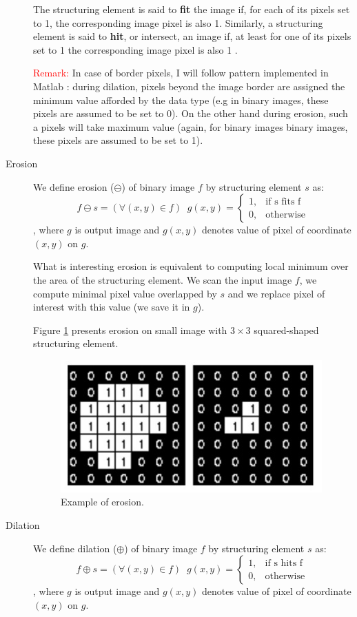 \documentclass{article}
\begin{document}
\begin{description}
The structuring element is said to \textbf{fit} the image if, for each of its pixels set to 1, the corresponding image pixel is also 1. Similarly, a structuring element is said to \textbf{hit}, or intersect, an image if, at least for one of its pixels set to 1 the corresponding image pixel is also 1 \cite{morphological}.

\textcolor{red}{Remark:} In case of border pixels, I will follow pattern implemented in Matlab \cite{matlab}: during dilation, pixels beyond the image border are assigned the minimum value afforded by the data type (e.g in binary images, these pixels are assumed to be set to 0). On the other hand during erosion, such a pixels will take maximum value (again, for binary images binary images, these pixels are assumed to be set to 1).

%
%
\item[Erosion] We define erosion ($\ominus$) of binary image $f$ by structuring element $s$ as:
\[
    f \ominus s= (\forall{(x,y) \in f})  \;\;
    g(x,y) = 
\begin{cases}
    1,& \text{if s fits f }\\
    0,              & \text{otherwise}
\end{cases} 
\]
, where $g$ is output image and $g(x,y)$ denotes value of pixel of coordinate $(x,y)$ on $g$.

What is interesting erosion is equivalent to computing local minimum over the area of the structuring element. We scan the input image $f$, we compute minimal pixel value overlapped by $s$ and we replace pixel of interest with this value (we save it in $g$)\cite{slajdy_morph}.

Figure \ref{fig:erosion_exampl} presents erosion on small image with $3 \times 3$ squared-shaped structuring element.
\begin{figure}[H]
  \centering
  \includegraphics[width=0.4\linewidth]{_Figures/erosion_example.jpg}
  \caption{Example of erosion.}
  \label{fig:erosion_exampl}
\end{figure}%

%
%
\item[Dilation] We define dilation ($\oplus$) of binary image $f$ by structuring element $s$ as:
\[
    f \oplus s= (\forall{(x,y) \in f})  \;\;
    g(x,y) = 
\begin{cases}
    1,& \text{if s hits f }\\
    0,              & \text{otherwise}
\end{cases} 
\]
, where $g$ is output image and $g(x,y)$ denotes value of pixel of coordinate $(x,y)$ on $g$.


\end{description}
\end{document}
